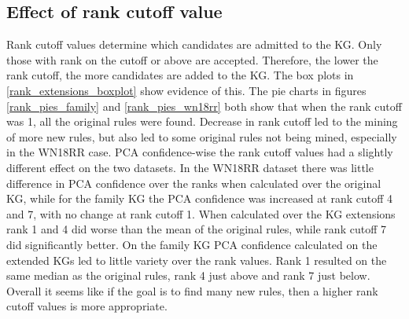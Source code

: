\fi




\newpage
\subsection{Effect of rank cutoff value}
Rank cutoff values determine which candidates are admitted to the KG. Only those with rank on the cutoff or above are accepted. Therefore, the lower the rank cutoff, the more candidates are added to the KG. The box plots in \cref{rank_extensions_boxplot} show evidence of this. The pie charts in figures \ref{rank_pies_family} and \ref{rank_pies_wn18rr} both show that when the rank cutoff was 1, all the original rules were found. Decrease in rank cutoff led to the mining of more new rules, but  also led to some original rules not being mined, especially in the WN18RR case. PCA confidence-wise the rank cutoff values had a slightly different effect on the two datasets. In the WN18RR dataset there was little difference in PCA confidence over the ranks when calculated over the original KG, while for the family KG the PCA confidence was increased at rank cutoff 4 and 7, with no change at rank cutoff 1. When calculated over the KG extensions rank 1 and 4 did worse than the mean of the original rules, while rank cutoff 7 did significantly better. On the family KG PCA confidence calculated on the extended KGs led to little variety over the rank values. Rank 1 resulted on the same median as the original rules, rank 4 just above and rank 7 just below. Overall it seems like if the goal is to find many new rules, then a higher rank cutoff values is more appropriate.

